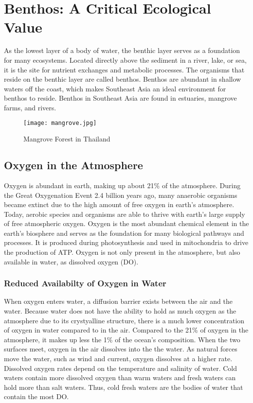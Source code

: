 \section{Benthos: A Critical Ecological Value}

As the lowest layer of a body of water, the benthic layer serves as a foundation for many ecosystems. Located directly above the sediment in a river, lake, or sea, it is the site for nutrient exchanges and metabolic processes. The organisms that reside on the benthic layer are called benthos. Benthos are abundant in shallow waters off the coast, which makes Southeast Asia an ideal environment for benthos to reside. Benthos in Southeast Asia are found in estuaries, mangrove farms, and rivers.

\begin{figure}[!ht]
        \centering
        \texttt{[image: mangrove.jpg]}
        \caption{Mangrove Forest in Thailand}
        \label{fig:Benthos Mangroves in Thailand}
\end{figure}

\subsection{Oxygen in the Atmosphere}
Oxygen is abundant in earth, making up about 21\% of the atmosphere. During the Great Oxygenation Event 2.4 billion years ago, many anaerobic organisms became extinct due to the high amount of free oxygen in earth's atmosphere. Today, aerobic species and organisms are able to thrive with earth's large supply of free atmospheric oxygen. Oxygen is the most abundant chemical element in the earth's biosphere and serves as the foundation for many biological pathways and processes. It is produced during photosynthesis and used in mitochondria to drive the production of ATP. Oxygen is not only present in the atmosphere, but also available in water, as dissolved oxygen (DO).

\subsubsection{Reduced Availabilty of Oxygen in Water}
When oxygen enters water, a diffusion barrier exists between the air and the water. Because water does not have the ability to hold as much oxygen as the atmosphere due to its crystyalline structure, there is a much lower concentration of oxygen in water compared to in the air. Compared to the 21\% of oxygen in the atmosphere, it makes up less the 1\% of the ocean's composition. When the two surfaces meet, oxygen in the air dissolves into the the water. As natural forces move the water, such as wind and current, oxygen dissolves at a higher rate. Dissolved oxygen rates depend on the temperature and salinity of water. Cold waters contain more dissolved oxygen than warm waters and fresh waters can hold more than salt waters. Thus, cold fresh waters are the bodies of water that contain the most DO. 

